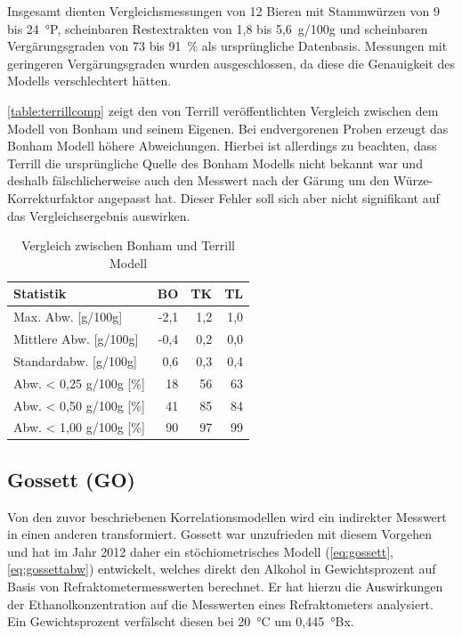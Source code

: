 \documentclass[a4paper,parskip=half]{scrartcl}
\begin{document}
Insgesamt dienten Vergleichsmessungen von 12 Bieren mit Stammwürzen
von 9 bis 24~°P, scheinbaren Restextrakten von 1,8 bis
5,6~g/100g und scheinbaren Vergärungsgraden von 73 bis 91~\%
als ursprüngliche Datenbasis. Messungen mit geringeren
Vergärungsgraden wurden ausgeschlossen, da diese die Genauigkeit des
Modells verschlechtert hätten.
\parencite{Terrill2010a,Terrill2011,Terrill2010}

\autoref{table:terrillcomp} zeigt den von Terrill veröffentlichten
Vergleich zwischen dem Modell von Bonham und seinem Eigenen. Bei
endvergorenen Proben erzeugt das Bonham Modell höhere
Abweichungen. Hierbei ist allerdings zu beachten, dass
Terrill die ursprüngliche Quelle des Bonham Modells nicht bekannt war
und deshalb fälschlicherweise auch den Messwert nach der Gärung um
den Würze-Korrekturfaktor angepasst hat. Dieser Fehler soll sich
aber nicht signifikant auf das Vergleichsergebnis auswirken.
\parencite{Terrill2010a,Terrill2011,Terrill2010}

\begin{table}[h]
\centering
\begin{tabular}{lrrr}
\toprule
Statistik & BO & TK & TL \\
\midrule
Max. Abw. [g/100g] & -2,1 & 1,2 & 1,0 \\
Mittlere Abw. [g/100g] & -0,4 & 0,2 & 0,0 \\
Standardabw. [g/100g] & 0,6 & 0,3 & 0,4 \\
Abw. < 0,25 g/100g [\%] & 18 & 56 & 63 \\
Abw. < 0,50 g/100g [\%] & 41 & 85 & 84 \\
Abw. < 1,00 g/100g [\%] & 90 & 97 & 99 \\
\bottomrule
\end{tabular}
\caption{Vergleich zwischen Bonham und Terrill Modell \parencite{Terrill2011}}
\label{table:terrillcomp}
\end{table}

\subsection*{Gossett (GO)}

Von den zuvor beschriebenen Korrelationsmodellen wird ein indirekter
Messwert in einen anderen transformiert. Gossett
war unzufrieden mit diesem Vorgehen und hat im Jahr 2012 daher ein
stöchiometrisches Modell (\autoref{eq:gossett}, \autoref{eq:gossettabw})
entwickelt, welches direkt den Alkohol in Gewichtsprozent auf Basis
von Refraktometermesswerten berechnet. Er hat hierzu die Auswirkungen
der Ethanolkonzentration
auf die Messwerten eines Refraktometers analysiert. Ein Gewichtsprozent
verfälscht diesen bei 20~°C um 0,445~°Bx. 
\parencite{Gossett2012,Gossett2012a,Gossett2012b}
\end{document}
